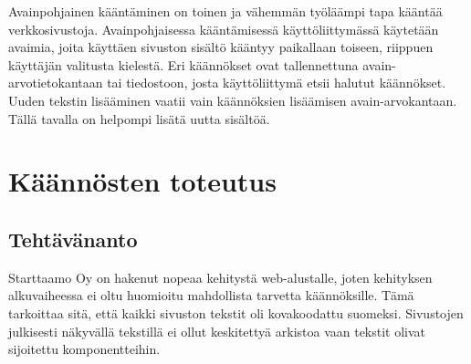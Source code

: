 \documentclass[11pt,a4paper,titlepage,oneside]{article}
\begin{document}




Avainpohjainen kääntäminen on toinen ja vähemmän työläämpi tapa kääntää verkkosivustoja.
Avainpohjaisessa kääntämisessä käyttöliittymässä käytetään avaimia, joita käyttäen sivuston sisältö kääntyy paikallaan toiseen, 
riippuen käyttäjän valitusta kielestä.
%
Eri käännökset ovat tallennettuna 
avain-arvotietokantaan tai tiedostoon,
josta käyttöliittymä etsii halutut käännökset.
Uuden tekstin lisääminen vaatii vain käännöksien lisäämisen avain-arvokantaan.
Tällä tavalla on helpompi lisätä uutta sisältöä.
\medskip

































\newpage






\section{Käännösten toteutus}




\subsection{Tehtävänanto}


Starttaamo Oy on hakenut nopeaa kehitystä web-alustalle, joten kehityksen alkuvaiheessa 
ei oltu huomioitu mahdollista tarvetta käännöksille. 
Tämä tarkoittaa sitä, että kaikki sivuston tekstit oli kovakoodattu suomeksi.
Sivustojen julkisesti näkyvällä tekstillä ei ollut keskitettyä arkistoa vaan tekstit olivat sijoitettu komponentteihin.
\medskip
\end{document}
